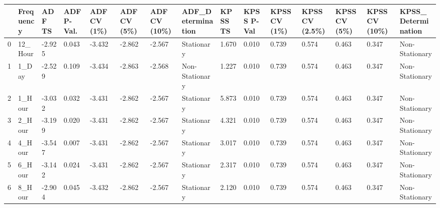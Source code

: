 \begin{tabular}{lllllllllllllll}
\toprule
 & Frequency & ADF TS & ADF P-Val. & ADF CV (1\%) & ADF CV (5\%) & ADF CV (10\%) & ADF_Determination & KPSS TS & KPSS P-Val & KPSS CV (1\%) & KPSS CV (2.5\%) & KPSS CV (5\%) & KPSS CV (10\%) & KPSS_Determination \\
\midrule
0 & 12_Hour & -2.925 & 0.043 & -3.432 & -2.862 & -2.567 & Stationary & 1.670 & 0.010 & 0.739 & 0.574 & 0.463 & 0.347 & Non-Stationary \\
1 & 1_Day & -2.529 & 0.109 & -3.434 & -2.863 & -2.568 & Non-Stationary & 1.227 & 0.010 & 0.739 & 0.574 & 0.463 & 0.347 & Non-Stationary \\
2 & 1_Hour & -3.032 & 0.032 & -3.431 & -2.862 & -2.567 & Stationary & 5.873 & 0.010 & 0.739 & 0.574 & 0.463 & 0.347 & Non-Stationary \\
3 & 2_Hour & -3.199 & 0.020 & -3.431 & -2.862 & -2.567 & Stationary & 4.321 & 0.010 & 0.739 & 0.574 & 0.463 & 0.347 & Non-Stationary \\
4 & 4_Hour & -3.547 & 0.007 & -3.431 & -2.862 & -2.567 & Stationary & 3.017 & 0.010 & 0.739 & 0.574 & 0.463 & 0.347 & Non-Stationary \\
5 & 6_Hour & -3.142 & 0.024 & -3.431 & -2.862 & -2.567 & Stationary & 2.317 & 0.010 & 0.739 & 0.574 & 0.463 & 0.347 & Non-Stationary \\
6 & 8_Hour & -2.904 & 0.045 & -3.432 & -2.862 & -2.567 & Stationary & 2.120 & 0.010 & 0.739 & 0.574 & 0.463 & 0.347 & Non-Stationary \\
\bottomrule
\end{tabular}
